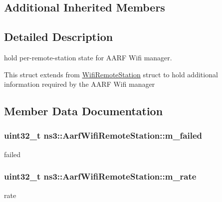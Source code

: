 \subsection*{Additional Inherited Members}


\subsection{Detailed Description}
hold per-\/remote-\/station state for A\+A\+RF Wifi manager. 

This struct extends from \hyperlink{structns3_1_1WifiRemoteStation}{Wifi\+Remote\+Station} struct to hold additional information required by the A\+A\+RF Wifi manager 

\subsection{Member Data Documentation}
\subsubsection[{\texorpdfstring{m\+\_\+failed}{m_failed}}]{\setlength{\rightskip}{0pt plus 5cm}uint32\+\_\+t ns3\+::\+Aarf\+Wifi\+Remote\+Station\+::m\+\_\+failed}\hypertarget{structns3_1_1AarfWifiRemoteStation_a7d2ddc46352742070b573798c3ace997}{}\label{structns3_1_1AarfWifiRemoteStation_a7d2ddc46352742070b573798c3ace997}


failed 

\subsubsection[{\texorpdfstring{m\+\_\+rate}{m_rate}}]{\setlength{\rightskip}{0pt plus 5cm}uint32\+\_\+t ns3\+::\+Aarf\+Wifi\+Remote\+Station\+::m\+\_\+rate}\hypertarget{structns3_1_1AarfWifiRemoteStation_aa5ecd8dd5aef8dbad45a90a6d49be72d}{}\label{structns3_1_1AarfWifiRemoteStation_aa5ecd8dd5aef8dbad45a90a6d49be72d}


rate 

